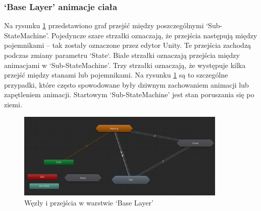 \documentclass[12pt,twoside]{article}
\begin{document}
\clearpage
\subsubsection{`Base Layer' animacje ciała}
Na rysunku \ref{Hero:Aniamtor:BaseLayerNodes} przedstawiono graf przejść między
poszczególnymi `Sub-StateMachine'. Pojedyncze szare strzałki oznaczają, że
przejścia następują między pojemnikami --  tak zostały oznaczone przez edytor
Unity. Te przejścia zachodzą podczas zmiany parametru `State`.  Białe strzałki
oznaczają przejścia między animacjami w `Sub-StateMachine'. Trzy strzałki
oznaczają, że występuje kilka przejść między stanami lub pojemnikami. Na rysunku
\ref{Hero:Aniamtor:BaseLayerNodes}  są to szczególne przypadki, które często
spowodowane były dziwnym zachowaniem animacji lub zapętleniem animacji.
Startowym `Sub-StateMachine' jest stan poruszania się po ziemi. 

\begin{figure}[!ht]
    \centering
	\includegraphics[width=10cm]{RealizacjaProjektu/UnityPictires/Animator/Player1_Animator_Main.jpg}
	\caption{Węzły i przejścia w warstwie `Base Layer'}
    \label{Hero:Aniamtor:BaseLayerNodes}
\end{figure}
\end{document}
